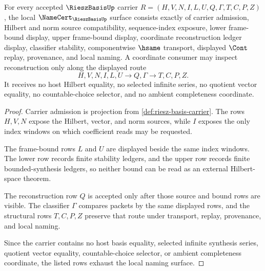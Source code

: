 \begin{theorem}
\label{thm:riesz-basis-namecert-obligations}
For every accepted $\RieszBasisUp$ carrier $R=(H,V,N,I,L,U,Q,\Gamma,T,C,P,Z)$, the local $\NameCert_{\RieszBasisUp}$ surface consists exactly of carrier admission, Hilbert and norm source compatibility, sequence-index exposure, lower frame-bound display, upper frame-bound display, coordinate reconstruction ledger display, classifier stability, componentwise $\hsame$ transport, displayed $\Cont$ replay, provenance, and local naming. A coordinate consumer may inspect reconstruction only along the displayed route
$$
H,V,N,I,L,U \longrightarrow Q,\Gamma \longrightarrow T,C,P,Z .
$$
It receives no host Hilbert equality, no selected infinite series, no quotient vector equality, no countable-choice selector, and no ambient completeness coordinate.
\end{theorem}
\begin{proof}
Carrier admission is projection from \autoref{def:riesz-basis-carrier}. The rows $H,V,N$ expose the Hilbert, vector, and norm sources, while $I$ exposes the only index windows on which coefficient reads may be requested.

The frame-bound rows $L$ and $U$ are displayed beside the same index windows. The lower row records finite stability ledgers, and the upper row records finite bounded-synthesis ledgers, so neither bound can be read as an external Hilbert-space theorem.

The reconstruction row $Q$ is accepted only after those source and bound rows are visible. The classifier $\Gamma$ compares packets by the same displayed rows, and the structural rows $T,C,P,Z$ preserve that route under transport, replay, provenance, and local naming.

Since the carrier contains no host basis equality, selected infinite synthesis series, quotient vector equality, countable-choice selector, or ambient completeness coordinate, the listed rows exhaust the local naming surface.
\end{proof}

